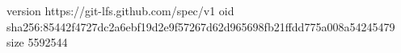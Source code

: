 version https://git-lfs.github.com/spec/v1
oid sha256:85442f4727dc2a6ebf19d2e9f57267d62d965698fb21ffdd775a008a54245479
size 5592544
